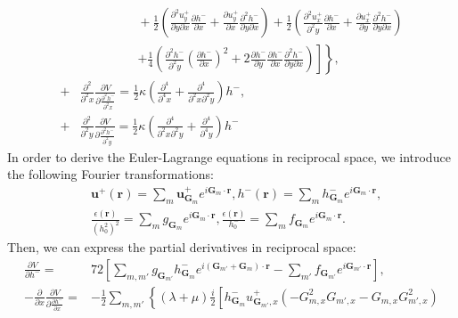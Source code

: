 \documentclass[aps,prx,10pt,twocolumn,superscriptaddress]{revtex4}
\begin{document}
\begin{widetext}
\begin{align}
&\ \ \ \ \ \ \ \ \ \ \ \ \ \ \ \ \ \ \ \ \ +\frac{1}{2}\left(\frac{\partial^{2}u^{+}_{y}}{\partial y\partial x}\frac{\partial h^{-}}{\partial x}+\frac{\partial u^{+}_{y}}{\partial x}\frac{\partial^{2}h^{-}}{\partial y\partial x}\right)+\frac{1}{2}\left( \frac{\partial^{2}u^{+}_{x}}{\partial^{2}y}\frac{\partial h^{-}}{\partial x}+\frac{\partial u^{+}_{x}}{\partial y}\frac{\partial^{2}h^{-}}{\partial y\partial x } \right)\nonumber\\
&\ \ \ \ \ \ \ \ \ \ \ \ \ \ \ \ \ \ \ \ \ \left.\left.+\frac{1}{4}\left( \frac{\partial^{2}h^{-}}{\partial^{2}y}\left( \frac{\partial h^{-}}{\partial x} \right)^{2}+2\frac{\partial h^{-}}{\partial y}\frac{\partial h^{-}}{\partial x}\frac{\partial^{2} h^{-}}{\partial y\partial x} \right)\right]\right\},\nonumber\\
+&\frac{\partial^{2}}{\partial^{2}x}\frac{\partial V}{\partial \frac{\partial^{2}h^{-}}{\partial^{2}x}}=\frac{1}{2}\kappa\left(\frac{\partial^{4}}{\partial^{4}x}+\frac{\partial^{4}}{\partial^{2}x\partial^{2}y}\right)h^{-},\nonumber\\
+&\frac{\partial^{2}}{\partial^{2}y}\frac{\partial V}{\partial \frac{\partial^{2}h^{-}}{\partial^{2}y}}=\frac{1}{2}\kappa\left(\frac{\partial^{4}}{\partial^{2}x\partial^{2}y}+\frac{\partial^{4}}{\partial^{4}y}\right)h^{-}
\end{align}
In order to derive the Euler-Lagrange equations in reciprocal space, we introduce the following Fourier transformations:
\allowdisplaybreaks
\begin{align}
&\textbf{u}^{+}(\textbf{r})=\sum_{m}\textbf{u}^{+}_{\textbf{G}_{m}}e^{i\textbf{G}_{m}\cdot\textbf{r}}, h^{-}(\textbf{r})=\sum_{m}h^{-}_{\textbf{G}_{m}}e^{i\textbf{G}_{m}\cdot\textbf{r}},\nonumber\\
&\frac{\epsilon(\textbf{r})}{(h^{2}_{0})^{2}}=\sum_{m}g_{\textbf{G}_{m}}e^{i\textbf{G}_{m}\cdot\textbf{r}}, \frac{\epsilon(\textbf{r})}{h^{-}_{0}}=\sum_{m}f_{\textbf{G}_{m}}e^{i\textbf{G}_{m}\cdot\textbf{r}}.
\end{align}
Then, we can express the partial derivatives in reciprocal space:
\allowdisplaybreaks
\begin{align}\label{eq5}
\frac{\partial V}{\partial h^{-}}=&72\left[\sum_{m,m'}g_{\textbf{G}_{m'}}h^{-}_{\textbf{G}_{m}}e^{i(\textbf{G}_{m'}+\textbf{G}_{m})\cdot\textbf{r}}-\sum_{m'}f_{\textbf{G}_{m'}}e^{i\textbf{G}_{m'}\cdot\textbf{r}}\right],\nonumber\\
-\frac{\partial}{\partial x}\frac{\partial V}{\partial \frac{\partial h^{-}}{\partial x}}=&-\frac{1}{2}\sum_{m,m'}\left\{ (\lambda+\mu)\frac{i}{2}\left[ h^{-}_{\textbf{G}_{m}}u^{+}_{\textbf{G}_{m'},x}(-G^{2}_{m,x}G_{m',x}-G_{m,x}G^{2}_{m',x})\right.\right. \nonumber\\

\end{align}
\end{widetext}
\end{document}
